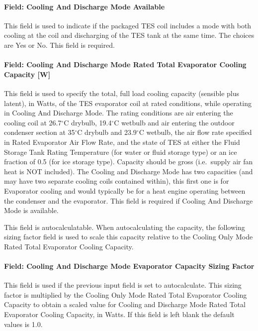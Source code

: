 \paragraph{Field: Cooling And Discharge Mode Available}\label{field-cooling-and-discharge-mode-available}

This field is used to indicate if the packaged TES coil includes a mode with both cooling at the coil and discharging of the TES tank at the same time. The choices are Yes or No. This field is required.

\paragraph{Field: Cooling And Discharge Mode Rated Total Evaporator Cooling Capacity {[}W{]}}\label{field-cooling-and-discharge-mode-rated-total-evaporator-cooling-capacity-w}

This field is used to specify the total, full load cooling capacity (sensible plus latent), in Watts, of the TES evaporator coil at rated conditions, while operating in Cooling And Discharge Mode. The rating conditions are air entering the cooling coil at 26.7$^\circ$C drybulb, 19.4$^\circ$C wetbulb and air entering the outdoor condenser section at 35$^\circ$C drybulb and 23.9$^\circ$C wetbulb, the air flow rate specified in Rated Evaporator Air Flow Rate, and the state of TES at either the Fluid Storage Tank Rating Temperature (for water or fluid storage type) or an ice fraction of 0.5 (for ice storage type). Capacity should be gross (i.e.~supply air fan heat is NOT included). The Cooling and Discharge Mode has two capacities (and may have two separate cooling coils contained within), this first one is for Evaporator cooling and would typically be for a heat engine operating between the condenser and the evaporator. This field is required if Cooling And Discharge Mode is available.

This field is autocalculatable. When autocalculating the capacity, the following sizing factor field is used to scale this capacity relative to the Cooling Only Mode Rated Total Evaporator Cooling Capacity.

\paragraph{Field: Cooling And Discharge Mode Evaporator Capacity Sizing Factor}\label{field-cooling-and-discharge-mode-evaporator-capacity-sizing-factor}

This field is used if the previous input field is set to autocalculate. This sizing factor is multiplied by the Cooling Only Mode Rated Total Evaporator Cooling Capacity to obtain a scaled value for Cooling and Discharge Mode Rated Total Evaporator Cooling Capacity, in Watts. If this field is left blank the default values is 1.0.


